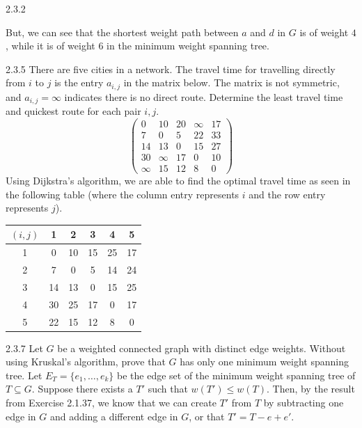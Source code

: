 \documentclass[8pt]{extarticle}
\begin{document}
{\begin{problem}{2.3.2}
\begin{center}
    \end{center}
    But, we can see that the shortest weight path between $a$ and $d$ in $G$ is of weight $4$, while it is of weight $6$ in the minimum weight spanning tree.
  \end{problem}
  \begin{problem}{2.3.5}
    There are five cities in a network. The travel time for travelling directly from $i$ to $j$ is the entry $a_{i,j}$ in the matrix below. The matrix is not symmetric, and $a_{i,j} = \infty$ indicates there is no direct route. Determine the least travel time and quickest route for each pair $i,j$.
    \[
      \begin{pmatrix}
        0 & 10 & 20 & \infty & 17 \\
        7 & 0 & 5 & 22 & 33 \\
        14 & 13 & 0 & 15 & 27 \\
        30 & \infty & 17 & 0 & 10 \\
        \infty & 15 & 12 & 8 & 0
      \end{pmatrix}
    \]
    \tcblower
    Using Dijkstra's algorithm, we are able to find the optimal travel time as seen in the following table (where the column entry represents $i$ and the row entry represents $j$).
    \begin{center}
    \renewcommand{\arraystretch}{1.5}
      \begin{tabular}{c|ccccc}
        $(i,j)$ & 1 & 2 & 3 & 4 & 5 \\
        \hline
        1 & 0 & 10 & 15 & 25 & 17 \\
        2 & 7 & 0 & 5 & 14 & 24 \\
        3 & 14 & 13 & 0 & 15 & 25 \\
        4 & 30 & 25 & 17 & 0 & 17 \\
        5 & 22 & 15 & 12 & 8 & 0
      \end{tabular}
    \end{center}
  \end{problem}
  \begin{problem}{2.3.7}
    Let $G$ be a weighted connected graph with distinct edge weights. Without using Kruskal's algorithm, prove that $G$ has only one minimum weight spanning tree.
    \tcblower
    Let $E_{T} = \{e_1,\dots,e_k\}$ be the edge set of the minimum weight spanning tree of $T\subseteq G$. Suppose there exists a $T'$ such that $w(T')\leq w(T)$. Then, by the result from Exercise 2.1.37, we know that we can create $T'$ from $T$ by subtracting one edge in $G$ and adding a different edge in $G$, or that $T' = T-e+e'$.\\


\end{problem}}
\end{document}
